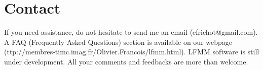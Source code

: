 \documentclass[10pt,a4paper]{article}
\begin{document}
\section{Contact}
If you need assistance, do not hesitate to send me an
email (efrichot@gmail.com). 
A FAQ (Frequently Asked Questions) section is available 
on our webpage (ttp://membres-timc.imag.fr/Olivier.Francois/lfmm.html). 
LFMM software is still under development. 
All your comments and feedbacks are more than welcome.



\end{document}
